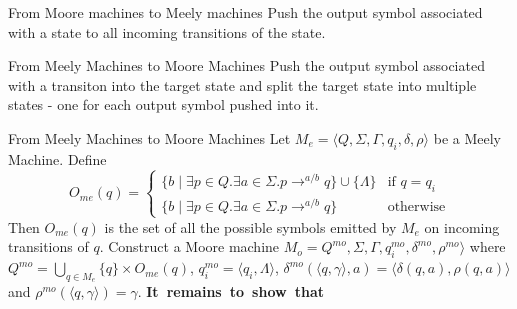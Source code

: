 \documentclass{beamer}
\begin{document}
\begin{frame}{From Moore machines to Meely machines} 
Push the output symbol associated with a state to all incoming transitions of the state.  

\end{frame}


\begin{frame}{From Meely Machines to Moore Machines}
Push the output symbol associated with a transiton into the target state 
and split the target state into multiple states 
- one for each output symbol pushed into it. 

\end{frame}

\begin{frame}{From Meely Machines to Moore Machines}
Let $M_e= \langle Q, \Sigma, \Gamma, q_i, \delta, \rho\rangle$ be a Meely Machine. 
Define
\[O_{me}(q) =\left\{\begin{array}{ll}
 \{ b\mid \exists p\in Q.\exists a\in\Sigma. p\longrightarrow^{a/b} q  \} \cup\{\Lambda\} & \mbox{if $q=q_i$} \\
   \{ b\mid \exists p\in Q.\exists a\in\Sigma. p\longrightarrow^{a/b} q  \} & \mbox{otherwise} 
 \end{array}\right.
 \]
Then $O_{me}(q)$ is the set of all the possible symbols
 emitted by $M_e$ on incoming transitions of $q$.  Construct a Moore machine $M_o=Q^{mo}, \Sigma, \Gamma, q_i^{mo}, \delta^{mo}, \rho^{mo}\rangle$ where
 $Q^{mo} = \bigcup_{q\in M_e} \{q\}\times O_{me}(q)$, $q_i^{mo}= \langle q_i,\Lambda\rangle$, 
 $\delta^{mo}(\langle q,\gamma\rangle, a) =\langle \delta(q,a), \rho(q,a)\rangle$ and 
 $\rho^{mo}(\langle q,\gamma\rangle) = \gamma$. \mbox{\bf It remains to show that }  
\end{frame}
\end{document}
